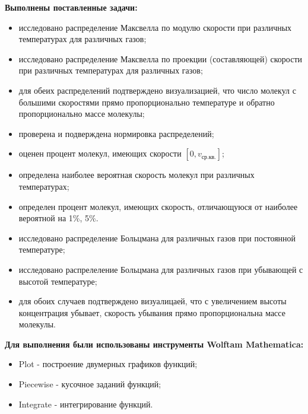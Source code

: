 \textbf{Выполнены поставленные задачи:}
\begin{itemize}
    \item исследовано распределение Максвелла по модулю скорости при различных температурах для различных газов; 
    \item исследовано распределение Максвелла по проекции (составляющей) скорости при различных температурах для различных газов; 
    \item для обеих распределений подтверждено визуализацией, 
        что число молекул с большими скоростями прямо пропорционально температуре 
        и обратно пропорционально массе молекулы;
    \item проверена и подверждена нормировка распределений;
    \item оценен процент молекул, имеющих скорости $[0, v_{\text{ср.кв.}}]$;
    \item определена наиболее вероятная скорость молекул при различных температурах;
    \item определен процент молекул, имеющих скорость, отличающуюся от наиболее вероятной на 1\%, 5\%.
    \item исследовано распределение Больцмана для различных газов при постоянной температуре;
    \item исследовано распрелеление Больцмана для различных газов при убывающей с высотой температуре;
    \item для обоих случаев подтверждено визуалицаей, что с увеличением высоты концентрация убывает,
        скорость убывания прямо пропорциональна массе молекулы.
\end{itemize}

\textbf{Для выполнения были использованы инструменты Wolftam Mathematica:}
\begin{itemize}
    \item Plot - построение двумерных графиков функций;
    \item Piecewise - кусочное заданий функций;
    \item Integrate - интегрирование функций.
\end{itemize}


